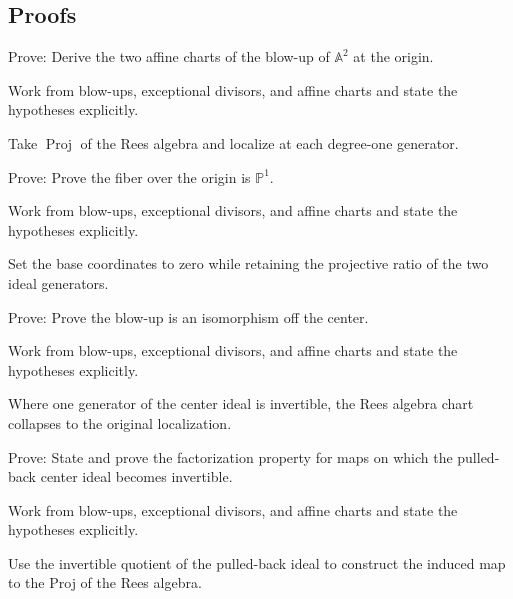 \subsection*{Proofs}

\begin{exercise}\label{exr:vi45-expand-06}
Prove: Derive the two affine charts of the blow-up of $\mathbb A^2$ at the origin.
\end{exercise}
\begin{hint}
Work from blow-ups, exceptional divisors, and affine charts and state the hypotheses explicitly.
\end{hint}
\begin{solution}
Take $\operatorname{Proj}$ of the Rees algebra and localize at each degree-one generator.
\end{solution}

\begin{exercise}\label{exr:vi45-expand-07}
Prove: Prove the fiber over the origin is $\mathbb P^1$.
\end{exercise}
\begin{hint}
Work from blow-ups, exceptional divisors, and affine charts and state the hypotheses explicitly.
\end{hint}
\begin{solution}
Set the base coordinates to zero while retaining the projective ratio of the two ideal generators.
\end{solution}

\begin{exercise}\label{exr:vi45-expand-08}
Prove: Prove the blow-up is an isomorphism off the center.
\end{exercise}
\begin{hint}
Work from blow-ups, exceptional divisors, and affine charts and state the hypotheses explicitly.
\end{hint}
\begin{solution}
Where one generator of the center ideal is invertible, the Rees algebra chart collapses to the original localization.
\end{solution}

\begin{exercise}\label{exr:vi45-expand-09}
Prove: State and prove the factorization property for maps on which the pulled-back center ideal becomes invertible.
\end{exercise}
\begin{hint}
Work from blow-ups, exceptional divisors, and affine charts and state the hypotheses explicitly.
\end{hint}
\begin{solution}
Use the invertible quotient of the pulled-back ideal to construct the induced map to the Proj of the Rees algebra.
\end{solution}

